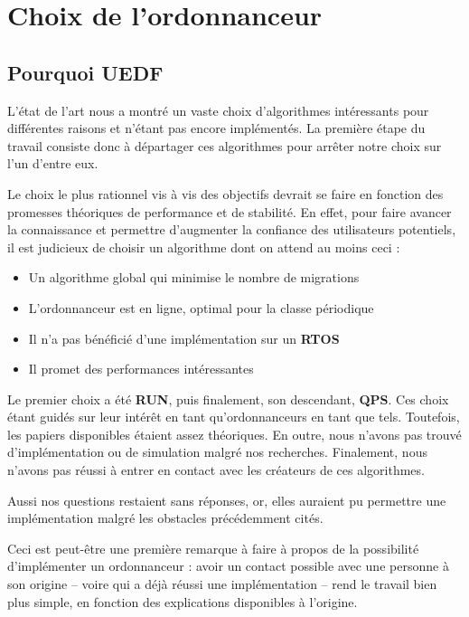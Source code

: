 \section{Choix de l'ordonnanceur}

	\subsection{Pourquoi UEDF}
	
	L'état de l'art nous a montré un vaste choix d'algorithmes intéressants pour différentes 
	raisons et n'étant pas encore implémentés. La première étape du travail consiste donc 
	à départager ces algorithmes pour arrêter notre choix sur l'un d'entre eux.
	
	Le choix le plus rationnel vis à vis des objectifs devrait se faire en fonction des 
	promesses théoriques de performance et de stabilité. 
	En effet, pour faire avancer la connaissance et permettre d'augmenter la confiance des utilisateurs 
	potentiels, il est judicieux de choisir un algorithme dont on attend au moins ceci :
	\begin{itemize}
		\item Un algorithme global qui minimise le nombre de migrations
		\item L'ordonnanceur est en ligne, optimal pour la classe périodique
		\item Il n'a pas bénéficié d'une implémentation sur un \textbf{RTOS}
		\item Il promet des performances intéressantes
	\end{itemize}
	
	Le premier choix a été \textbf{RUN}, puis finalement, son descendant, \textbf{QPS}. Ces choix étant guidés 
	sur leur intérêt en tant qu'ordonnanceurs en tant que tels.
	Toutefois, les papiers disponibles étaient assez théoriques. En outre, nous n'avons pas 
	trouvé d'implémentation ou de simulation malgré nos recherches.
	Finalement, nous n'avons pas réussi à entrer en contact avec les créateurs de ces algorithmes. 
	
	Aussi nos questions restaient sans réponses, or, elles auraient pu permettre une implémentation 
	malgré les obstacles précédemment cités.\newline
	
	Ceci est peut-être une première remarque à faire à propos de la possibilité d'implémenter 
	un ordonnanceur : avoir un contact possible avec une personne à son origine -- voire qui a déjà 
	réussi une implémentation -- rend le travail bien plus simple, en fonction des 
	explications disponibles à l'origine.\newline
	

